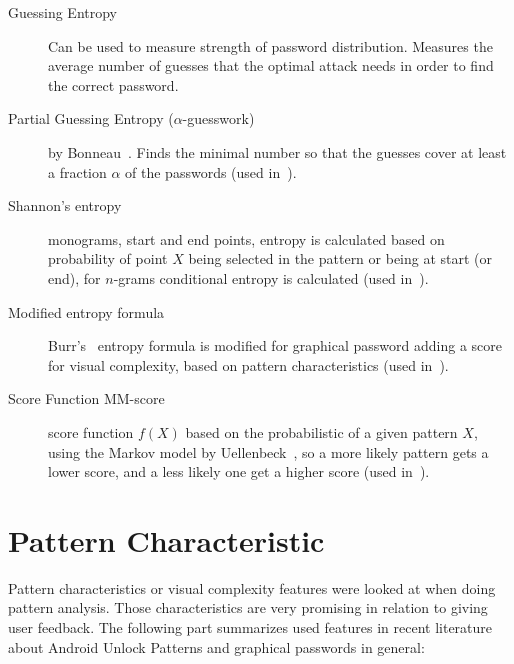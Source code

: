 \documentclass[twocolumn, a4paper, 10pt]{article}
\begin{document}
\begin{description}
	\item[Guessing Entropy] Can be used to measure strength of password distribution. Measures the average number of guesses that the optimal attack needs in order to find the correct password.~\cite{massey1994guessing}
	
	\item[Partial Guessing Entropy ($\alpha$-guesswork)] by Bonneau~\cite{Bonneau:2012:QRP:2310656.2310722}. Finds the minimal number so that the guesses cover at least a fraction $\alpha$ of the passwords (used in~\cite{Uellenbeck:2013:QSG:2508859.2516700}).
	
	\item[Shannon's entropy] monograms, start and end points, entropy is calculated based on probability of point $X$ being selected in the pattern or being at start (or end), for $n$-grams conditional entropy is calculated (used in~\cite{Aviv:2014:UVP:2664243.2664253}).
	
	\item[Modified entropy formula] Burr's~\cite{burr2004electronic} entropy formula is modified for graphical password adding a score for visual complexity,  based on pattern characteristics (used in~\cite{Sun2014308}).
	
	\item[Score Function MM-score] score function $f(X)$ based on the probabilistic of a given pattern $X$, using the Markov model by Uellenbeck~\cite{Uellenbeck:2013:QSG:2508859.2516700}, so a more likely pattern gets a lower score, and a less likely one get a higher score (used in~\cite{siadati2015fortifying}).
\end{description}


\section{Pattern Characteristic}
\label{sec:characteristics}

Pattern characteristics or visual complexity features were looked at when doing pattern analysis. Those characteristics are very promising in relation to giving user feedback. The following part summarizes used features in recent literature about Android Unlock Patterns and graphical passwords in general:
\end{document}
